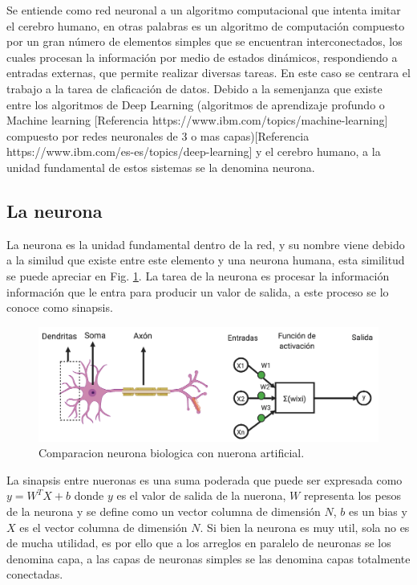 Se entiende como red neuronal a un algoritmo computacional que intenta imitar el cerebro humano, en otras palabras es un algoritmo de computación compuesto por un gran número de elementos simples que se
encuentran interconectados, los cuales procesan la información por medio de estados dinámicos, respondiendo a entradas externas, que permite realizar diversas tareas.
En este caso se centrara el trabajo a la tarea de claficación de datos.
Debido a la semenjanza que existe entre los algoritmos de Deep Learning (algoritmos de aprendizaje profundo o
Machine learning [Referencia https://www.ibm.com/topics/machine-learning] compuesto por redes neuronales
de 3 o mas capas)[Referencia https://www.ibm.com/es-es/topics/deep-learning] y el cerebro humano, a la
unidad fundamental de estos sistemas se la denomina neurona.


\subsection{La neurona}

La neurona es la unidad fundamental dentro de la red, y su nombre viene debido a la similud que existe entre este elemento y una neurona humana, esta similitud se puede apreciar en Fig. \ref{fig:comparativa-neuronas}. La tarea de la neurona es procesar la información información que le entra para producir un valor de salida, a este proceso se lo conoce como sinapsis.

\begin{figure}[h]
    \centering
    \includegraphics[width=1\textwidth]{imgs/comparacion-neurona-red.png}
    \caption{Comparacion neurona biologica con nuerona artificial.}
    \label{fig:comparativa-neuronas}
\end{figure}

La sinapsis entre nueronas es una suma poderada que puede ser expresada como $y =W^T X + b$ donde $y$ es el valor de salida de la nuerona,
$W$ representa los pesos de la neurona y se define como un vector columna de dimensión $N$, $b$ es un bias y $X$ es el vector columna de dimensión $N$. Si bien la neurona es muy util, sola no es de mucha utilidad, es por ello que a los arreglos en paralelo de neuronas se los denomina capa, a las capas de neuronas simples se las denomina capas totalmente conectadas.

